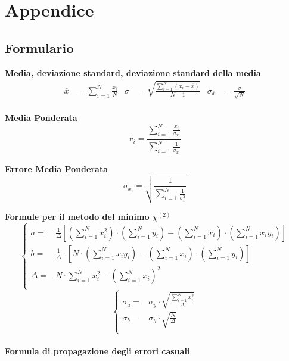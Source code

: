 \documentclass[a4paper,11pt,oneside]{article}
\begin{document}
\newpage
\section{Appendice}

\subsection{Formulario}
\textbf{Media, deviazione standard, deviazione standard della media}
\begin{align*}
        \overline{x}&=\sum\limits_{i=1}^{N} \frac{x_{i}}{N}&
        \sigma&=\sqrt{\frac{\sum\limits_{i=1}^{N} (x_{i}-\overline{x})}{N-1}}&
        \sigma_{\overline{x}}&=\frac{\sigma}{\sqrt{N}}
\end{align*}\\

\textbf{Media Ponderata}
\begin{equation*}
\label{eq:media_pond}
    x_i=\frac{\sum_{i=1}^{N}\frac{x_i}{\sigma_{x_i}}}{\sum_{i=1}^{N}\frac{1}{\sigma_{x_i}}}
\end{equation*}

\textbf{Errore Media Ponderata}
\begin{equation*}
\label{eq:errore_media_pond}
     \sigma_{x_i}=\sqrt{\frac{1}{\sum_{i=1}^{N}\frac{1}{\sigma_{i}^{2}}}}
\end{equation*}

\textbf{Formule per il metodo del minimo ${\chi}^{(2)}$}
\begin{equation*}
        \begin{cases}
    a=&\frac{1}{\Delta}[(\sum\limits_{i=1}^{N}{x_{i}^{2}})\cdot(\sum\limits_{i=1}^{N}{y_{i}})-(\sum\limits_{i=1}^{N}{x_{i}})\cdot(\sum\limits_{i=1}^{N}{x_{i}y_{i}})] \\ 
    b=&\frac{1}{\Delta }\cdot \left [N\cdot \left ( \sum\limits_{i=1}^{N}x_i y_i \right )-\left ( \sum\limits_{i=1}^{N}x_i \right )\cdot \left ( \sum\limits_{i=1}^{N}y_i \right )  \right ]\\
    \Delta=& N\cdot \sum\limits_{i=1}^{N} x_i^{2} - \left ( \sum\limits_{i=1}^{N}x_i \right )^{2}\\
    \end{cases}
\end{equation*}
\begin{equation*}
    \begin{cases}
    \sigma_{a}=&\sigma_{y}\cdot\sqrt{\frac{\sum_{i=1}^{N}{x_{i}^{2}}}{\Delta}} \\
    \sigma_{b}=&\sigma_y\cdot \sqrt{\frac{N}{\Delta }}\\
    \end{cases}
    \label{equation:err_chi_quadro}
\end{equation*}
\\
\textbf{Formula di propagazione degli errori casuali}\\
\end{document}
